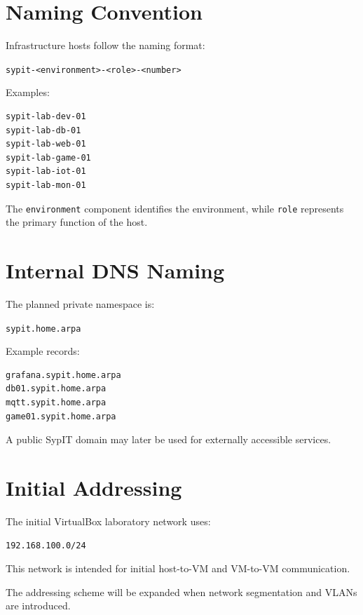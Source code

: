 \section{Naming Convention}

Infrastructure hosts follow the naming format:

\begin{center}
\texttt{sypit-<environment>-<role>-<number>}
\end{center}

Examples:

\begin{verbatim}
sypit-lab-dev-01
sypit-lab-db-01
sypit-lab-web-01
sypit-lab-game-01
sypit-lab-iot-01
sypit-lab-mon-01
\end{verbatim}

The \texttt{environment} component identifies the environment, while
\texttt{role} represents the primary function of the host.

\section{Internal DNS Naming}

The planned private namespace is:

\begin{center}
\texttt{sypit.home.arpa}
\end{center}

Example records:

\begin{verbatim}
grafana.sypit.home.arpa
db01.sypit.home.arpa
mqtt.sypit.home.arpa
game01.sypit.home.arpa
\end{verbatim}

A public SypIT domain may later be used for externally accessible services.

\newpage
\section{Initial Addressing}

The initial VirtualBox laboratory network uses:

\begin{center}
\texttt{192.168.100.0/24}
\end{center}

This network is intended for initial host-to-VM and VM-to-VM communication.

The addressing scheme will be expanded when network segmentation and VLANs
are introduced.